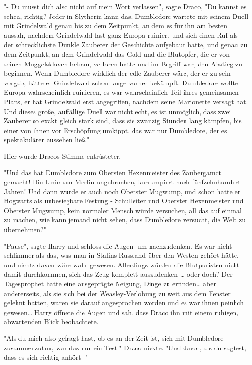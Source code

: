 {"- Du musst dich also nicht auf mein Wort verlassen", sagte Draco, "Du kannst es sehen, richtig? Jeder in Slytherin kann das. Dumbledore wartete mit seinem Duell mit Grindelwald genau bis zu dem Zeitpunkt, an dem es für ihn am besten aussah, nachdem Grindelwald fast ganz Europa ruiniert und sich einen Ruf als der schrecklichste Dunkle Zauberer der Geschichte aufgebaut hatte, und genau zu dem Zeitpunkt, an dem Grindelwald das Gold und die Blutopfer, die er von seinen Muggelsklaven bekam, verloren hatte und im Begriff war, den Abstieg zu beginnen. Wenn Dumbledore wirklich der edle Zauberer wäre, der er zu sein vorgab, hätte er Grindelwald schon lange vorher bekämpft. Dumbledore wollte Europa wahrscheinlich ruinieren, es war wahrscheinlich Teil ihres gemeinsamen Plans, er hat Grindelwald erst angegriffen, nachdem seine Marionette versagt hat. Und dieses große, auffällige Duell war nicht echt, es ist unmöglich, dass zwei Zauberer so exakt gleich stark sind, dass sie zwanzig Stunden lang kämpfen, bis einer von ihnen vor Erschöpfung umkippt, das war nur Dumbledore, der es spektakulärer aussehen ließ."

Hier wurde Dracos Stimme entrüsteter.

"Und das hat Dumbledore zum Obersten Hexenmeister des Zaubergamot gemacht! Die Linie von Merlin ungebrochen, korrumpiert nach fünfzehnhundert Jahren! Und dann wurde er auch noch Oberster Mugwump, und schon hatte er Hogwarts als unbesiegbare Festung - Schulleiter und Oberster Hexenmeister und Oberster Mugwump, kein normaler Mensch würde versuchen, all das auf einmal zu machen, wie kann jemand nicht sehen, dass Dumbledore versucht, die Welt zu übernehmen?"

"Pause", sagte Harry und schloss die Augen, um nachzudenken. Es war nicht schlimmer als das, was man in Stalins Russland über den Westen gehört hätte, und nichts davon wäre wahr gewesen. Allerdings würden die Blutpuristen nicht damit durchkommen, sich das Zeug komplett auszudenken … oder doch? Der Tagesprophet hatte eine ausgeprägte Neigung, Dinge zu erfinden… aber andererseits, als sie sich bei der Weasley-Verlobung zu weit aus dem Fenster gelehnt hatten, waren sie darauf angesprochen worden und es war ihnen peinlich gewesen… Harry öffnete die Augen und sah, dass Draco ihn mit einem ruhigen, abwartenden Blick beobachtete.

"Als du mich also gefragt hast, ob es an der Zeit ist, sich mit Dumbledore zusammenzutun, war das nur ein Test." Draco nickte. "Und davor, als du sagtest, dass es sich richtig anhört -"

}
